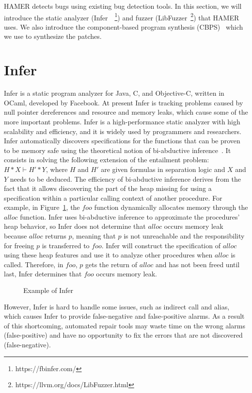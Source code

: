 \documentclass[a4paper,11pt,oneside,openany]{book}
\begin{document}
HAMER detects bugs using existing bug detection tools. In this section, we will introduce the static analyzer (Infer~\cite{infer}~\footnote{https://fbinfer.com/}) and fuzzer (LibFuzzer~\footnote{https://llvm.org/docs/LibFuzzer.html}) that HAMER uses. We also introduce the component-based program synthesis (CBPS)~\cite{oracle} which we use to synthesize the patches. 

\section{Infer}

Infer is a static program analyzer for Java, C, and Objective-C, written in OCaml, developed by Facebook. At present Infer is tracking problems caused by null pointer dereferences and resource and memory leaks, which cause some of the more important problems. Infer is a high-performance static analyzer with high scalability and efficiency, and it is widely used by programmers and researchers. Infer automatically discovers specifications for the functions that can be proven to be memory safe using the theoretical notion of bi-abductive inference~\cite{bi}. It consists in solving the following extension of the entailment problem: $H*X\vdash H'*Y$, where $H$ and $H'$ are given formulas in separation logic and $X$ and $Y$ needs to be deduced. The efficiency of bi-abductive inference derives from the fact that it allows discovering the part of the heap missing for using a specification within a particular calling context of another procedure. 
For example, in Figure~\ref{inferexample}, the $foo$ function dynamically allocates memory through the $alloc$ function. Infer uses bi-abductive inference to approximate the procedures' heap behavior, so Infer does not determine that $alloc$ occurs memory leak because $alloc$ returns $p$, meaning that $p$ is not unreachable and the responsibility for freeing $p$ is transferred to $foo$. Infer will construct the specification of $alloc$ using these heap features and use it to analyze other procedures when $alloc$ is called. Therefore, in $foo$, $p$ gets the return of $alloc$ and has not been freed until last, Infer determines that $foo$ occurs memory leak.

\begin{figure}[h]
    
    \caption{Example of Infer}
    \label{inferexample}
\end{figure}

However, Infer is hard to handle some issues, such as indirect call and alias, which causes Infer to provide false-negative and false-positive alarms. As a result of this shortcoming, automated repair tools may waste time on the wrong alarms (false-positive) and have no opportunity to fix the errors that are not discovered (false-negative).
\end{document}
